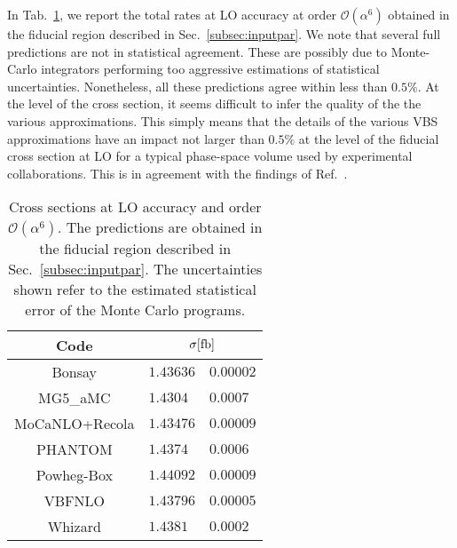 In Tab.~\ref{tab:wg1_LOrates}, we report the total rates at LO accuracy at order $\mathcal{O}(\alpha^6)$ obtained in the fiducial region described in Sec.~\ref{subsec:inputpar}.
We note that several full predictions are not in statistical agreement. These are possibly due to Monte-Carlo 
integrators performing too aggressive estimations of statistical uncertainties. Nonetheless, all these predictions agree within less than $0.5\%$.
At the level of the cross section, it seems difficult to infer the quality of the the various approximations.
This simply means that the details of the various VBS approximations have an impact not larger than $0.5\%$ at 
the level of the fiducial cross section at LO for a typical phase-space volume used by experimental collaborations.
This is in agreement with the findings of Ref.~\cite{Denner:2012dz,Oleari:2003tc}.

\begin{table}[h!]
    \centering
    \begin{tabular}{c|r@{ $\pm$ }l}
      Code  &  \multicolumn{2}{c}{$\sigma[\rm{fb}]$}  \\
        \hline
        \hline
        {\sc Bonsay}  &  $1.43636$ & $0.00002$ \\
        {\sc MG5\_aMC}&  $1.4304\phantom{0}$ & $0.0007$ \\
        {\sc MoCaNLO+Recola}  &  $1.43476$ & $0.00009$ \\
        {\sc PHANTOM} &  $1.4374\phantom{0}$ & $0.0006 $  \\
        {\sc Powheg-Box}  &  $1.44092$ & $0.00009$ \\
        {\sc VBFNLO}  &  $1.43796$ & $0.00005$ \\
        {\sc Whizard} &  $1.4381\phantom{0}$ & $0.0002 $
    \end{tabular}
    \caption{\label{tab:wg1_LOrates} Cross sections at LO accuracy and order $\mathcal{O}(\alpha^6)$.
    The predictions are obtained in the fiducial region described in Sec.~\ref{subsec:inputpar}.
    The uncertainties shown refer to the estimated statistical error of the Monte Carlo programs.}
\end{table}
